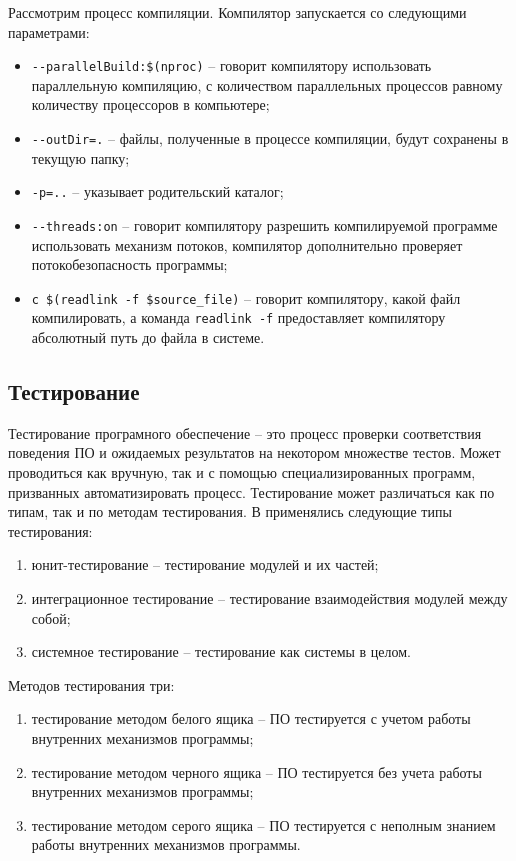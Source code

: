 Рассмотрим процесс компиляции. Компилятор запускается со следующими параметрами:
\begin{itemize}
    \item \verb|--parallelBuild:$(nproc)| -- говорит компилятору 
        использовать параллельную компиляцию, с количеством параллельных процессов равному
        количеству процессоров в компьютере;
    \item \verb|--outDir=.| -- файлы, полученные в процессе компиляции, будут сохранены в 
        текущую папку;
    \item \verb|-p=..| -- указывает родительский каталог;
    \item \verb|--threads:on| -- говорит компилятору разрешить компилируемой программе использовать
        механизм потоков, компилятор дополнительно проверяет потокобезопасность программы;
    \item \verb|с $(readlink -f $source_file)| -- говорит компилятору, какой файл компилировать,
        а команда \verb|readlink -f| предоставляет компилятору абсолютный путь до файла в системе.
\end{itemize}

\subsection{Тестирование {\ProgModule}}\label{sec:ch3/sec1/sub2}
Тестирование програмного обеспечение -- это процесс проверки соответствия поведения 
ПО и ожидаемых результатов на некотором множестве тестов. Может проводиться как вручную,
так и с помощью специализированных программ, призванных автоматизировать процесс.
Тестирование может различаться как по типам, так и по методам тестирования.
В {\ProgModule} применялись следующие типы тестирования:
\begin{enumerate}[label={\arabic*)}]
    \item юнит-тестирование -- тестирование модулей {\ProgModule} и их частей;
    \item интеграционное тестирование -- тестирование взаимодействия модулей
        {\ProgModule} между собой;
    \item системное тестирование -- тестирование {\ProgModule} как системы в целом.
\end{enumerate}
Методов тестирования три:
\begin{enumerate}[label={\arabic*)}]
    \item тестирование методом белого ящика -- ПО тестируется с учетом
        работы внутренних механизмов программы;
    \item тестирование методом черного ящика -- ПО тестируется без учета
        работы внутренних механизмов программы;
    \item тестирование методом серого ящика -- ПО тестируется с неполным знанием
        работы внутренних механизмов программы.
\end{enumerate}

